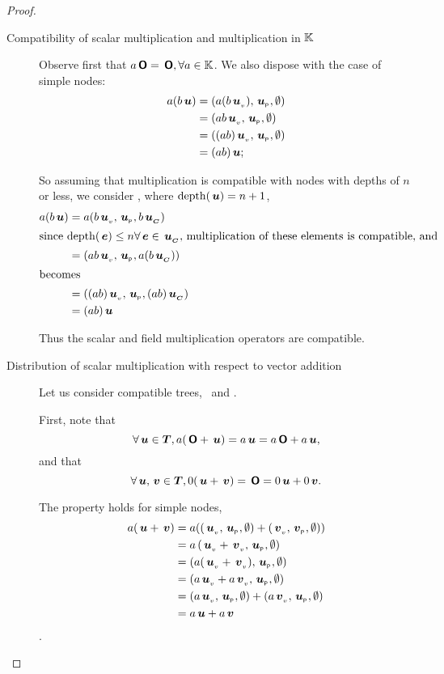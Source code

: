 \begin{proposition}
\begin{proof}
\begin{description}
    \item[Compatibility of scalar multiplication and multiplication in $\FIELD$]\label{additivecompatibility}

      Observe first that \(a \zerotree = \zerotree, \forall a \in
      \FIELD\). We also dispose with the case of simple nodes:
      \begin{align*}
          a(b \node{u}) &= (a(b \nv{u}), \nlabel{u}, \emptyset) \\
          &= (a b \nv{u}, \nlabel{u}, \emptyset) \\
          &= ((a b) \nv{u}, \nlabel{u}, \emptyset) \\
          &= (a b) \node{u};
      \end{align*}

      So assuming that multiplication is compatible with nodes with
      depths of \(n\) or less, we consider , where \(\depth(\node{u})
      = n+1\),
      \begin{align*}
        a (b \node{u}) &= a (b  \nv{u}, \nlabel{u}, b\child{u}) \\
        \intertext{since \(\depth(\node{e}) \leq n \forall \node{e}\in \child{u},\) multiplication of these elements is compatible, and }
          &= (a b\/ \nv{u}, \nlabel{u}, a(b\child{u})) \\
          \intertext{becomes}
          &= ((a b) \nv{u}, \nlabel{u}, (a b)\child{u}) \\
          &= (a b) \node{u}
      \end{align*}

      Thus the scalar and field multiplication operators are compatible.

      
    \item[Distribution of scalar multiplication with respect to vector addition]\label{additivedistributivity}

      Let us consider compatible trees, \ and .
      
      First, note that \[\forall \node{u} \in \DOM, a(\zerotree + \node{u}) = a \node{u} = a\zerotree + a \node{u},\]
      and that \[\forall \node{u},\node{v}\in\DOM, 0 (\node{u} + \node{v}) = \zerotree = 0 \node{u} + 0 \node{v}.\]

      The property holds for simple nodes, 
      \begin{align*}
        a(\node{u} + \node{v}) &= a (\Node{\nv{u}}{\nlabel{u}}{\emptyset} + \Node{\nv{v}}{\nlabel{v}}{\emptyset})\\ 
        &= a \Node{\nv{u} + \nv{v}}{\nlabel{u}}{\emptyset} \\
        &= \Node{a(\nv{u} + \nv{v})}{\nlabel{u}}{\emptyset} \\
        &= \Node{a\nv{u} + a\nv{v}}{\nlabel{u}}{\emptyset} \\
        &= \Node{a\nv{u}}{\nlabel{u}}{\emptyset} + \Node{a\nv{v}}{\nlabel{u}}{\emptyset} \\
        &= a \node{u} + a \node{v}
      \end{align*}.


\end{description}
\end{proof}
\end{proposition}
